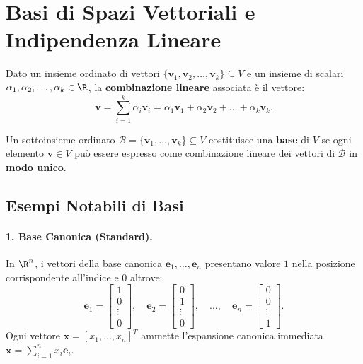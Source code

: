 \FloatBarrier
\section{Basi di Spazi Vettoriali e Indipendenza Lineare}

\begin{definition}
Dato un insieme ordinato di vettori $\{\mathbf{v}_1, \mathbf{v}_2, \dots, \mathbf{v}_k\} \subseteq V$ e un insieme di scalari $\alpha_1, \alpha_2, \dots, \alpha_k \in \R$, la \textbf{combinazione lineare} associata è il vettore:
\begin{equation}
    \mathbf{v} = \sum_{i=1}^k \alpha_i \mathbf{v}_i = \alpha_1 \mathbf{v}_1 + \alpha_2 \mathbf{v}_2 + \dots + \alpha_k \mathbf{v}_k.
\end{equation}
\end{definition}

\begin{definition}
Un sottoinsieme ordinato $\mathcal{B} = \{\mathbf{v}_1, \dots, \mathbf{v}_k\} \subseteq V$ costituisce una \textbf{base} di $V$ se ogni elemento $\mathbf{v} \in V$ può essere espresso come combinazione lineare dei vettori di $\mathcal{B}$ in \textbf{modo unico}.
\end{definition}

\subsection{Esempi Notabili di Basi}

\paragraph{1. Base Canonica (Standard).}
In $\R^n$, i vettori della base canonica $\mathbf{e}_1, \dots, \mathbf{e}_n$ presentano valore $1$ nella posizione corrispondente all'indice e $0$ altrove:
\begin{equation}
    \mathbf{e}_1 = \begin{bmatrix} 1 \\ 0 \\ \vdots \\ 0 \end{bmatrix}, \quad \mathbf{e}_2 = \begin{bmatrix} 0 \\ 1 \\ \vdots \\ 0 \end{bmatrix}, \quad \dots, \quad \mathbf{e}_n = \begin{bmatrix} 0 \\ 0 \\ \vdots \\ 1 \end{bmatrix}.
\end{equation}
Ogni vettore $\mathbf{x} = [x_1, \dots, x_n]^T$ ammette l'espansione canonica immediata $\mathbf{x} = \sum_{i=1}^n x_i \mathbf{e}_i$.


